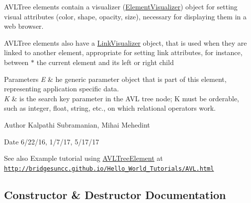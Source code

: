 A\+V\+L\+Tree elements contain a visualizer (\mbox{\hyperlink{namespace_bridges_1_1_element_visualizer}{Element\+Visualizer}}) object for setting visual attributes (color, shape, opacity, size), necessary for displaying them in a web browser.

A\+V\+L\+Tree elements also have a \mbox{\hyperlink{namespace_bridges_1_1_link_visualizer}{Link\+Visualizer}} object, that is used when they are linked to another element, appropriate for setting link attributes, for instance, between $\ast$ the current element and its left or right child


\begin{DoxyParams}{Parameters}
{\em E} & he generic parameter object that is part of this element, representing application specific data. \\
\hline
{\em K} & is the search key parameter in the A\+VL tree node; K must be orderable, such as integer, float, string, etc., on which relational operators work.\\
\hline
\end{DoxyParams}
\begin{DoxyAuthor}{Author}
Kalpathi Subramanian, Mihai Mehedint
\end{DoxyAuthor}
\begin{DoxyDate}{Date}
6/22/16, 1/7/17, 5/17/17
\end{DoxyDate}
\begin{DoxySeeAlso}{See also}
Example tutorial using \mbox{\hyperlink{class_bridges_1_1_a_v_l_tree_element_1_1_a_v_l_tree_element}{A\+V\+L\+Tree\+Element}} at ~\newline
 \href{http://bridgesuncc.github.io/Hello_World_Tutorials/AVL.html}{\tt http\+://bridgesuncc.\+github.\+io/\+Hello\+\_\+\+World\+\_\+\+Tutorials/\+A\+V\+L.\+html} 
\end{DoxySeeAlso}


\subsection{Constructor \& Destructor Documentation}
\mbox{\label{class_bridges_1_1_a_v_l_tree_element_1_1_a_v_l_tree_element_abe1f188885a526cdaca8eb37d51ca8eb}} 
